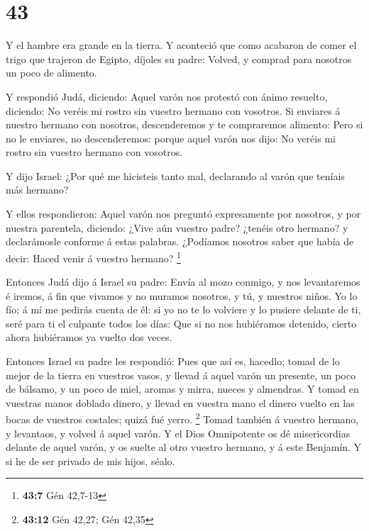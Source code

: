 \hypertarget{section-42}{%
\section{43}\label{section-42}}

 Y el hambre era grande en la tierra.  Y
aconteció que como acabaron de comer el trigo que trajeron de Egipto,
díjoles su padre: Volved, y comprad para nosotros un poco de alimento.

 Y respondió Judá, diciendo: Aquel varón nos protestó con
ánimo resuelto, diciendo: No veréis mi rostro sin vuestro hermano con
vosotros.  Si enviares á nuestro hermano con nosotros,
descenderemos y te compraremos alimento:  Pero si no le
enviares, no descenderemos: porque aquel varón nos dijo: No veréis mi
rostro sin vuestro hermano con vosotros.

 Y dijo Israel: ¿Por qué me hicisteis tanto mal,
declarando al varón que teníais más hermano?

 Y ellos respondieron: Aquel varón nos preguntó
expresamente por nosotros, y por nuestra parentela, diciendo: ¿Vive aún
vuestro padre? ¿tenéis otro hermano? y declarámosle conforme á estas
palabras. ¿Podíamos nosotros saber que había de decir: Haced venir á
vuestro hermano? \footnote{\textbf{43:7} Gén 42,7-13}

 Entonces Judá dijo á Israel su padre: Envía al mozo
conmigo, y nos levantaremos é iremos, á fin que vivamos y no muramos
nosotros, y tú, y nuestros niños.  Yo lo fío; á mí me
pedirás cuenta de él: si yo no te lo volviere y lo pusiere delante de
ti, seré para ti el culpante todos los días:  Que si no
nos hubiéramos detenido, cierto ahora hubiéramos ya vuelto dos veces.

 Entonces Israel su padre les respondió: Pues que así es,
hacedlo; tomad de lo mejor de la tierra en vuestros vasos, y llevad á
aquel varón un presente, un poco de bálsamo, y un poco de miel, aromas y
mirra, nueces y almendras.  Y tomad en vuestras manos
doblado dinero, y llevad en vuestra mano el dinero vuelto en las bocas
de vuestros costales; quizá fué yerro. \footnote{\textbf{43:12} Gén
  42,27; Gén 42,35}  Tomad también á vuestro hermano, y
levantaos, y volved á aquel varón.  Y el Dios Omnipotente
os dé misericordias delante de aquel varón, y os suelte al otro vuestro
hermano, y á este Benjamín. Y si he de ser privado de mis hijos, séalo.

